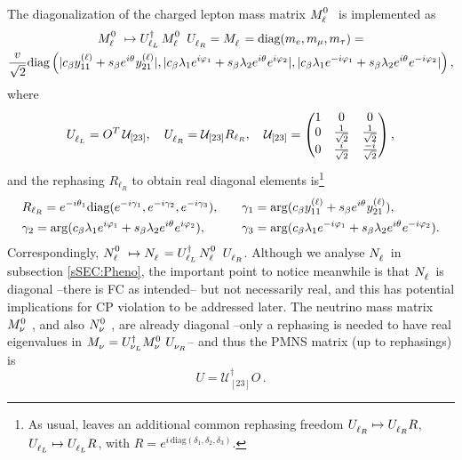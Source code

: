 \documentclass[12pt,a4paper]{article}
\begin{document}
The diagonalization of the charged lepton mass matrix $\wML$ is implemented as
\begin{multline}\label{eq:MassMatricesLep:01}
\wML\mapsto \ULLd\,\wML\,\URL=\mML=\text{diag}(m_e,m_\mu,m_\tau)=\\ \frac{\vev{}}{\sqrt 2}\text{diag}\left(\abs{\Cb\yL{11}+\Sb e^{i\vevPh{}}\yL{21}},\abs{\Cb\lambda_{1}e^{i\varphi_1}+\Sb\lambda_2 e^{i\vevPh{}}e^{i\varphi_2}},\abs{\Cb\lambda_{1}e^{-i\varphi_1}+\Sb\lambda_2 e^{i\vevPh{}}e^{-i\varphi_2}}\right),
\end{multline}
where
\begin{equation}\label{eq:LepDiag:00}
 \ULL=O^T\,\mathcal U_{[23]},\quad \URL=\mathcal U_{[23]}R_{\ell_R},\quad 
 \mathcal U_{[23]}=\begin{pmatrix}1&0&0\\ 0&\frac{1}{\sqrt 2}& \frac{1}{\sqrt 2}\\ 0&\frac{i}{\sqrt 2}& \frac{-i}{\sqrt 2}\end{pmatrix},
\end{equation}
and the rephasing $R_{\ell_R}$ to obtain real diagonal elements is\footnote{As usual,  leaves an additional common rephasing freedom $\URL\mapsto\URL R$, $\ULL\mapsto\ULL R$, with $R=e^{i\,\text{diag}(\delta_1,\delta_2,\delta_3)}$.}
\begin{equation}
\begin{aligned}
 &R_{\ell_R}=e^{-i\vevPh{1}}\text{diag}(e^{-i\gamma_1},e^{-i\gamma_2},e^{-i\gamma_3}),\quad && \gamma_1=\arg(\Cb\yL{11}+\Sb e^{i\vevPh{}}\yL{21}),\\ &\gamma_2=\arg(\Cb\lambda_{1}e^{i\varphi_1}+\Sb\lambda_2 e^{i\vevPh{}}e^{i\varphi_2}),\ &&\gamma_3=\arg(\Cb\lambda_{1}e^{-i\varphi_1}+\Sb\lambda_2 e^{i\vevPh{}}e^{-i\varphi_2}).
 \end{aligned}
\end{equation}
Correspondingly, $\wNL\mapsto\mNL=\ULLd\,\wNL\,\URL$. Although we analyse $\mNL$ in subsection \ref{sSEC:Pheno}, the important point to notice meanwhile is that $\mNL$ is diagonal --there is FC as intended-- but not necessarily real, and this has potential implications for CP violation to be addressed later. The neutrino mass matrix $\wMN$, and also $\wNN$, are already diagonal --only a rephasing is needed to have real eigenvalues in $\mMN=\ULNd\wMN\URN$-- and thus the PMNS matrix (up to rephasings) is
\begin{equation}\label{eq:PMNS:00}
 U=\mathcal U_{[23]}^\dagger O\,.
\end{equation}
\end{document}
